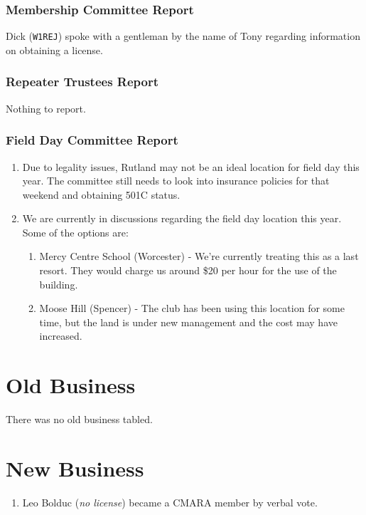 \documentclass[10pt,letterpaper]{article}
\begin{document}
\subsubsection{Membership Committee Report}
Dick (\texttt{W1REJ}) spoke with a gentleman by the name of Tony regarding information on obtaining a license.

\subsubsection{Repeater Trustees Report}

Nothing to report.

\subsubsection{Field Day Committee Report}

\begin{enumerate}
\item Due to legality issues, Rutland may not be an ideal location for field day this year. The committee still needs to look into insurance policies for that weekend and obtaining 501C status.
\item We are currently in discussions regarding the field day location this year. Some of the options are:
\begin{enumerate}
\item Mercy Centre School (Worcester) - We're currently treating this as a last resort. They would charge us around \$20 per hour for the use of the building.
\item Moose Hill (Spencer) - The club has been using this location for some time, but the land is under new management and the cost may have increased.
\end{enumerate}
\end{enumerate}

\section{Old Business}

There was no old business tabled.

\section{New Business}

\begin{enumerate}
\item Leo Bolduc (\emph{no license}) became a CMARA member by verbal vote.
\end{enumerate}
\end{document}

